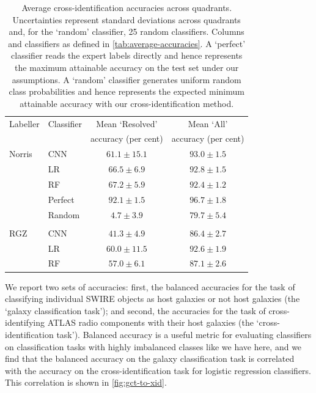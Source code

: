 \documentclass[fleqn,usenatbib,usedcolumn]{mnras}
\begin{document}
    \begin{table}
      \caption{Average cross-identification accuracies across quadrants.
        Uncertainties represent standard deviations across quadrants and, for
        the `random' classifier, 25 random classifiers. Columns and
        classifiers as defined in \autoref{tab:average-accuracies}.  A
        `perfect' classifier reads the expert labels directly and hence
        represents the maximum attainable accuracy on the test set under our
        assumptions. A `random' classifier generates uniform random class
        probabilities and hence represents the expected minimum attainable
        accuracy with our cross-identification method.}
        \label{tab:cross-id-accuracies}
      \begin{tabular}{llcc}
      \hline
      Labeller & Classifier  & Mean `Resolved' & Mean `All' \\
       & & accuracy (per cent) & accuracy (per cent)\\
      \hline
      Norris & CNN & $61.1 \pm 15.1$ & $93.0 \pm 1.5$\\
       & LR & $66.5 \pm 6.9$ & $92.8 \pm 1.5$\\
       & RF & $67.2 \pm 5.9$ & $92.4 \pm 1.2$\\
       & Perfect & $92.1 \pm 1.5$ & $96.7 \pm 1.8$\\
       & Random & $4.7 \pm 3.9$ & $79.7 \pm 5.4$\\
       \\
      RGZ & CNN & $41.3 \pm 4.9$ & $86.4 \pm 2.7$\\
       & LR & $60.0 \pm 11.5$ & $92.6 \pm 1.9$\\
       & RF & $57.0 \pm 6.1$ & $87.1 \pm 2.6$\\
       \hline
      \end{tabular}
    \end{table}

    We report two sets of accuracies: first, the balanced accuracies for the
    task of classifying individual SWIRE objects as host galaxies or not host
    galaxies (the `galaxy classification task'); and second, the accuracies
    for the task of cross-identifying ATLAS radio components with their host
    galaxies (the `cross-identification task'). Balanced accuracy is a useful
    metric for evaluating classifiers on classification tasks with highly
    imbalanced classes like we have here, and we find that the balanced
    accuracy on the galaxy classification task is correlated with the accuracy
    on the cross-identification task for logistic regression classifiers. This
    correlation is shown in \autoref{fig:gct-to-xid}.
\end{document}
